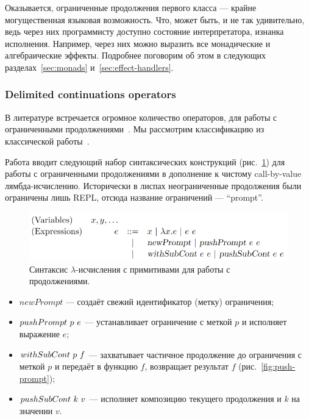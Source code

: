 Оказывается, ограниченные продолжения первого класса --- крайне могущественная языковая возможность.
Что, может быть, и не так удивительно, ведь через них программисту доступно состояние интерпретатора, изнанка исполнения.
Например, через них можно выразить все монадические и алгебраические эффекты.
Подробнее поговорим об этом в следующих разделах~\ref{sec:monads} и~\ref{sec:effect-handlers}.

\subsubsection{Delimited continuations operators}

В литературе встречается огромное количество операторов, для работы с ограниченными продолжениями~\cite[приложение А]{hillerstrom2022foundations}.
Мы рассмотрим классификацию из классической работы~\cite{dyvbig2007monadic}.

Работа вводит следующий набор синтаксических конструкций (рис.~\ref{fig:prompt-syntax}) для работы с ограниченными продолжениями в дополнение к чистому call-by-value лямбда-исчислению.
Исторически в лиспах неограниченные продолжения были ограничены лишь REPL, отсюда название ограничений --- ``prompt''.

\begin{figure}[h]
    \centering
    \includegraphics[width=0.75\linewidth]{figs/prompt-syntax}
    \caption{Синтаксис $\lambda$-исчисления с примитивами для работы с продолжениями.}
    \label{fig:prompt-syntax}
\end{figure}

\begin{itemize}
    \item $newPrompt$ --- создаёт свежий идентификатор (метку) ограничения;
    \item $pushPrompt ~ p ~ e$ --- устанавливает ограничение с меткой $p$ и исполняет выражение $e$;
    \item $withSubCont~ p~ f$ --- захватывает частичное продолжение до ограничения с меткой $p$ и передаёт в функцию $f$, возвращает результат $f$ (рис.~\ref{fig:push-prompt});
    \item $pushSubCont~ k ~ v$ --- исполняет композицию текущего продолжения и $k$ на значении $v$.
\end{itemize}


